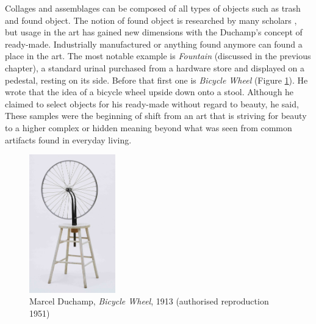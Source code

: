 Collages and assemblages can be composed of all types of objects such as trash and found object. The notion of found object is researched by many scholars \cite{camic2010trashed, gascoyne1935short}, but usage in the art has gained new dimensions with the Duchamp’s concept of ready-made. Industrially manufactured or anything found  anymore can found a place in the art. The most notable example is \textit{Fountain} (discussed in the previous chapter), a standard urinal purchased from a hardware store and displayed on a pedestal, resting on its side. Before that first one is \textit{Bicycle Wheel} (Figure \ref{fig:Duchamp_BicycleWheel}). He wrote that the idea of a bicycle wheel upside down onto a stool. Although he claimed to select objects for his ready-made without regard to beauty, he said,  These samples were the beginning of 
shift from an art that is striving for beauty to a higher complex or hidden meaning beyond what was seen from common artifacts found in everyday living.

\begin{figure}[h!]
  \centering
  \includegraphics[height=6cm]{graphics/duchamp-bicycle-wheel-1913.jpg}
  \caption{Marcel Duchamp, \textit{Bicycle Wheel}, 1913 (authorised reproduction 1951)}
  \label{fig:Duchamp_BicycleWheel}
\end{figure}

